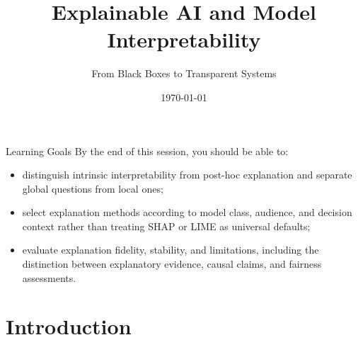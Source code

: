 \documentclass[aspectratio=169]{beamer}
\title{Explainable AI and Model Interpretability}
\subtitle{From Black Boxes to Transparent Systems}
\date{\today}
\begin{document}

\begin{frame}
  \titlepage
\end{frame}

\begin{frame}{Learning Goals}
  By the end of this session, you should be able to:
  \begin{itemize}
    \item distinguish intrinsic interpretability from post-hoc explanation and separate global questions from local ones;
    \item select explanation methods according to model class, audience, and decision context rather than treating SHAP or LIME as universal defaults;
    \item evaluate explanation fidelity, stability, and limitations, including the distinction between explanatory evidence, causal claims, and fairness assessments.
  \end{itemize}
\end{frame}

\tocslide

\section{Introduction}
\end{document}
